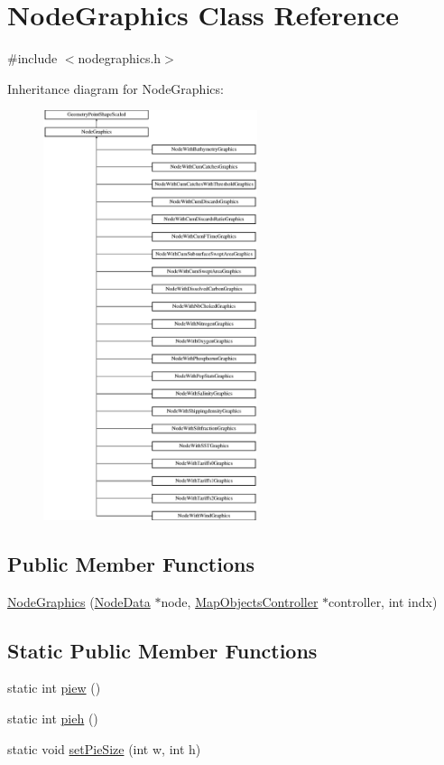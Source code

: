 \hypertarget{class_node_graphics}{}\section{Node\+Graphics Class Reference}
\label{class_node_graphics}


{\ttfamily \#include $<$nodegraphics.\+h$>$}

Inheritance diagram for Node\+Graphics\+:\begin{figure}[H]
\begin{center}
\leavevmode
\includegraphics[height=12.000000cm]{d1/daa/class_node_graphics}
\end{center}
\end{figure}
\subsection*{Public Member Functions}
\begin{DoxyCompactItemize}
\item 
\mbox{\hyperlink{class_node_graphics_a9894fd1077e465d00bf96230529fac7d}{Node\+Graphics}} (\mbox{\hyperlink{class_node_data}{Node\+Data}} $\ast$node, \mbox{\hyperlink{class_map_objects_controller}{Map\+Objects\+Controller}} $\ast$controller, int indx)
\end{DoxyCompactItemize}
\subsection*{Static Public Member Functions}
\begin{DoxyCompactItemize}
\item 
static int \mbox{\hyperlink{class_node_graphics_a131cc63f5869f007f02361e2bb6d6b81}{piew}} ()
\item 
static int \mbox{\hyperlink{class_node_graphics_a145e79965e7ea36e933ff17ff70e921d}{pieh}} ()
\item 
static void \mbox{\hyperlink{class_node_graphics_ad536d9c19c486cfe1a2d3f9de96d109b}{set\+Pie\+Size}} (int w, int h)
\end{DoxyCompactItemize}
